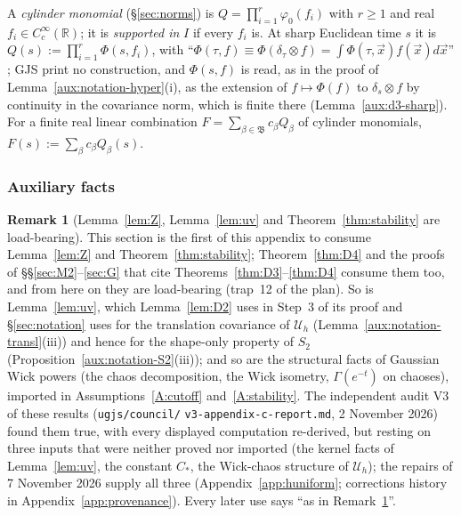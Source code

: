 \documentclass[11pt,a4paper]{article}
\theoremstyle{plain}
\theoremstyle{definition}
\theoremstyle{plain}
\theoremstyle{definition}
\newtheorem{auxrem}[auxlemma]{Remark}
\newcommand{\R}{\mathbb{R}}
\newcommand{\Uc}{\mathcal U}
\begin{document}
A \emph{cylinder monomial} (\S\ref{sec:norms}) is $Q=\prod_{i=1}^r\varphi_0(f_i)$
with $r\ge1$ and real $f_i\in C_c^\infty(\R)$; it is \emph{supported in} $I$ if every $f_i$ is.
At sharp Euclidean time $s$ it is $Q(s):=\prod_{i=1}^r\Phi(s,f_i)$, with
``$\Phi(\tau,f)\equiv\Phi(\delta_\tau\otimes f)=\int\Phi(\tau,\vec x)f(\vec x)d\vec x$''
\cite[p.~589]{GJS}; GJS print no construction, and $\Phi(s,f)$ is read, as in the proof of
Lemma~\ref{aux:notation-hyper}(i), as the extension of $f\mapsto\Phi(f)$ to $\delta_s\otimes f$ by
continuity in the covariance norm, which is finite there (Lemma~\ref{aux:d3-sharp}).  For a finite
real linear combination $F=\sum_{\beta\in\mathfrak B}c_\beta Q_\beta$ of cylinder monomials,
$F(s):=\sum_\beta c_\beta Q_\beta(s)$.

\subsubsection{Auxiliary facts}\label{sub:d3-aux}

\begin{auxrem}[Lemma~\ref{lem:Z}, Lemma~\ref{lem:uv} and Theorem~\ref{thm:stability} are load-bearing]\label{aux:d3-V3}
This section is the first of this appendix to consume Lemma~\ref{lem:Z} and
Theorem~\ref{thm:stability}; Theorem~\ref{thm:D4} and the proofs of
\S\S\ref{sec:M2}--\ref{sec:G} that cite Theorems~\ref{thm:D3}--\ref{thm:D4} consume them too, and from
here on they are load-bearing (trap~12 of the plan).  So is Lemma~\ref{lem:uv}, which
Lemma~\ref{lem:D2} uses in Step~3 of its proof and \S\ref{sec:notation} uses for the
translation covariance of $\Uc_h$ (Lemma~\ref{aux:notation-transl}(iii)) and hence for the
shape-only property of $S_2$ (Proposition~\ref{aux:notation-S2}(iii)); and so are the
structural facts of Gaussian Wick powers (the chaos decomposition, the Wick isometry,
$\Gamma(e^{-t})$ on chaoses), imported in Assumptions~\ref{A:cutoff} and~\ref{A:stability}.
The independent audit V3 of these results (\texttt{ugjs/council/}\allowbreak
\texttt{v3-appendix-c-report.md}, 2 November 2026) found them true, with every displayed
computation re-derived, but resting on three inputs that were neither proved nor imported (the
kernel facts of Lemma~\ref{lem:uv}, the constant $C_*$, the Wick-chaos structure of $\Uc_h$); the
repairs of 7 November 2026 supply all three (Appendix~\ref{app:huniform}; corrections history in
Appendix~\ref{app:provenance}).  Every later use says ``as in Remark~\ref{aux:d3-V3}''.
\end{auxrem}
\end{document}
